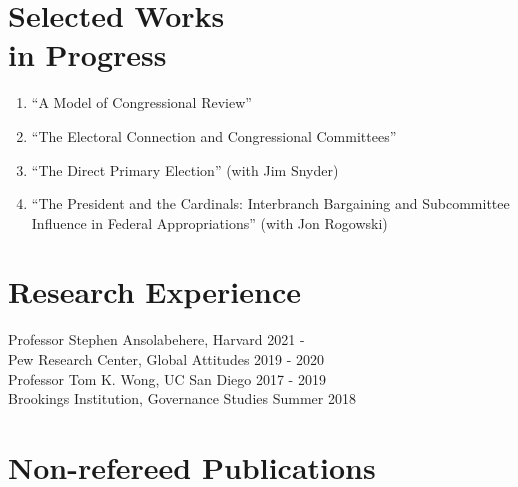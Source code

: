 \documentclass[margin, line]{res}
\begin{document}
\begin{resume}
\section{Selected Works \\in Progress}
\begin{enumerate}
	\item ``A Model of Congressional Review''
	\item ``The Electoral Connection and Congressional Committees''
	\item ``The Direct Primary Election'' (with Jim Snyder)
	\item ``The President and the Cardinals: Interbranch Bargaining and Subcommittee Influence in Federal Appropriations'' (with Jon Rogowski)
\end{enumerate}

\section{Research Experience}
Professor Stephen Ansolabehere, Harvard \hfill 2021 - \\
Pew Research Center, Global Attitudes \hfill 2019 - 2020\\
Professor Tom K. Wong, UC San Diego \hfill 2017 - 2019\\
Brookings Institution, Governance Studies \hfill Summer 2018

\section{Non-refereed Publications}


\end{resume}
\end{document}
